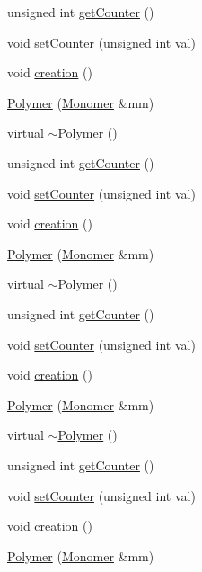 \begin{DoxyCompactItemize}
\item 
unsigned int \hyperlink{class_polymer_a8346d821e5f8690d7816ba1d40036b69}{get\+Counter} ()
\item 
void \hyperlink{class_polymer_a7ed6bbe09a570b59f9253d63fd3326d2}{set\+Counter} (unsigned int val)
\item 
void \hyperlink{class_polymer_a1daba3eb2ba8428bf2f3e814668b155f}{creation} ()
\item 
\hyperlink{class_polymer_ae77454a3908652e4df6a26b9cac509a5}{Polymer} (\hyperlink{class_monomer}{Monomer} \&mm)
\item 
virtual \hyperlink{class_polymer_aac2b3983f375a5691c7d5ca1a79594d5}{$\sim$\+Polymer} ()
\item 
unsigned int \hyperlink{class_polymer_a8346d821e5f8690d7816ba1d40036b69}{get\+Counter} ()
\item 
void \hyperlink{class_polymer_a7ed6bbe09a570b59f9253d63fd3326d2}{set\+Counter} (unsigned int val)
\item 
void \hyperlink{class_polymer_a1daba3eb2ba8428bf2f3e814668b155f}{creation} ()
\item 
\hyperlink{class_polymer_ae77454a3908652e4df6a26b9cac509a5}{Polymer} (\hyperlink{class_monomer}{Monomer} \&mm)
\item 
virtual \hyperlink{class_polymer_aac2b3983f375a5691c7d5ca1a79594d5}{$\sim$\+Polymer} ()
\item 
unsigned int \hyperlink{class_polymer_a8346d821e5f8690d7816ba1d40036b69}{get\+Counter} ()
\item 
void \hyperlink{class_polymer_a7ed6bbe09a570b59f9253d63fd3326d2}{set\+Counter} (unsigned int val)
\item 
void \hyperlink{class_polymer_a1daba3eb2ba8428bf2f3e814668b155f}{creation} ()
\item 
\hyperlink{class_polymer_ae77454a3908652e4df6a26b9cac509a5}{Polymer} (\hyperlink{class_monomer}{Monomer} \&mm)
\item 
virtual \hyperlink{class_polymer_aac2b3983f375a5691c7d5ca1a79594d5}{$\sim$\+Polymer} ()
\item 
unsigned int \hyperlink{class_polymer_a8346d821e5f8690d7816ba1d40036b69}{get\+Counter} ()
\item 
void \hyperlink{class_polymer_a7ed6bbe09a570b59f9253d63fd3326d2}{set\+Counter} (unsigned int val)
\item 
void \hyperlink{class_polymer_a1daba3eb2ba8428bf2f3e814668b155f}{creation} ()
\item 
\hyperlink{class_polymer_ae77454a3908652e4df6a26b9cac509a5}{Polymer} (\hyperlink{class_monomer}{Monomer} \&mm)

\end{DoxyCompactItemize}

